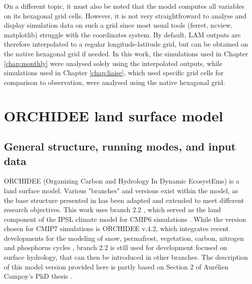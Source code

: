 \hfill

On a different topic, it must also be noted that the model computes all variables on its hexagonal grid cells. However, it is not very straightfroward to analyse and display simulation data on such a grid since most usual tools (ferret, ncview, matplotlib) struggle with the coordinates system. 
By default, LAM outputs are therefore interpolated to a regular longitude-latitude grid, but can be obtained on the native hexagonal grid if needed.
In this work, the simulations used in Chapter \ref{chap:monthly} were analysed solely using the interpolated outputs, while simulations used in Chapter \ref{chap:liaise}, which used specific grid cells for comparison to observation, were analysed using the native hexagonal grid.


\section{ORCHIDEE land surface model}
\subsection{General structure, running modes, and input data}
ORCHIDEE (Organizing Carbon and Hydrology In Dynamic EcosystEms) is a land surface model. Various "branches" and versions exist within the model, as the base structure presented in \citet{krinner_dynamic_2005} has been adapted and extended to meet different research objectives. 
This work uses branch 2.2 \citep{cheruy_improved_2020}, which served as the land component of the IPSL climate model for CMIP6 simulations \citep{boucher_presentation_2020}. While the version chosen for CMIP7 simulations is ORCHIDEE v.4.2, which integrates recent developments for the modeling of snow, permafrost, vegetation, carbon, nitrogen and phosphorus cycles %
, branch 2.2 is still used for development focused on surface hydrology, that can then be introduced in other branches.
The description of this model version provided here is partly based on Section 2 of Aurélien Campoy’s PhD thesis \citep{campoy_influence_2013}. %

